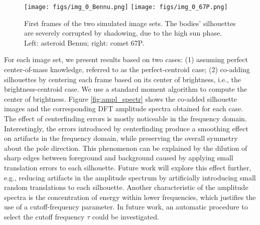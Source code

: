 \begin{figure}[t!]
    \centering
    \texttt{[image: figs/img\_0\_Bennu.png]}
    \texttt{[image: figs/img\_0\_67P.png]}
    \caption{First frames of the two simulated image sets. The bodies' silhouettes are severely corrupted by shadowing, due to the high sun phase. Left: asteroid Bennu; right: comet 67P.}
    \label{fig:img_0}
\end{figure}

For each image set, we present results based on two cases: (1) assuming perfect center-of-mass knowledge, referred to as the perfect-centroid case; (2) co-adding silhouettes by centering each frame based on its center of brightness, i.e., the brightness-centroid case. We use a standard moment algorithm to compute the center of brightness\cite{owen2011methods}. Figure \ref{fig:ampl_spectr} shows the co-added silhouette images and the corresponding DFT amplitude spectra obtained for each case. The effect of centerfinding errors is mostly noticeable in the frequency domain. Interestingly, the errors introduced by centerfinding produce a smoothing effect on artifacts in the frequency domain, while preserving the overall symmetry about the pole direction. This phenomenon can be explained by the dilution of sharp edges between foreground and background caused by applying small translation errors to each silhouette. Future work will explore this effect further, e.g., reducing artifacts in the amplitude spectrum by artificially introducing small random translations to each silhouette. Another characteristic of the amplitude spectra is the concentration of energy within lower frequencies, which justifies the use of a cutoff-frequency parameter. In future work, an automatic procedure to select the cutoff frequency $\tau$ could be investigated.


